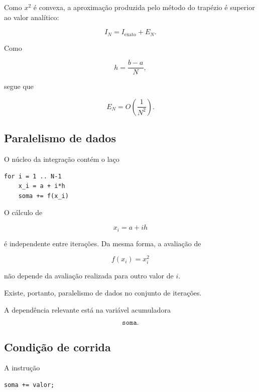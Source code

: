 Como \(x^2\) é convexa, a aproximação produzida pelo método do trapézio é
superior ao valor analítico:

\begin{equation}
    I_N =
    I_{\text{exato}} + E_N.
\end{equation}

Como

\begin{equation}
    h = \frac{b-a}{N},
\end{equation}

segue que

\begin{equation}
    E_N =
    O\left(\frac{1}{N^2}\right).
\end{equation}


\subsection{Paralelismo de dados}

O núcleo da integração contém o laço

\begin{verbatim}
for i = 1 .. N-1
    x_i = a + i*h
    soma += f(x_i)
\end{verbatim}

O cálculo de

\begin{equation}
    x_i=a+ih
\end{equation}

é independente entre iterações. Da mesma forma, a avaliação de

\begin{equation}
    f(x_i)=x_i^2
\end{equation}

não depende da avaliação realizada para outro valor de \(i\).

Existe, portanto, paralelismo de dados no conjunto de iterações.

A dependência relevante está na variável acumuladora

\begin{equation}
    \texttt{soma}.
\end{equation}


\subsection{Condição de corrida}

A instrução

\begin{verbatim}
soma += valor;
\end{verbatim}

